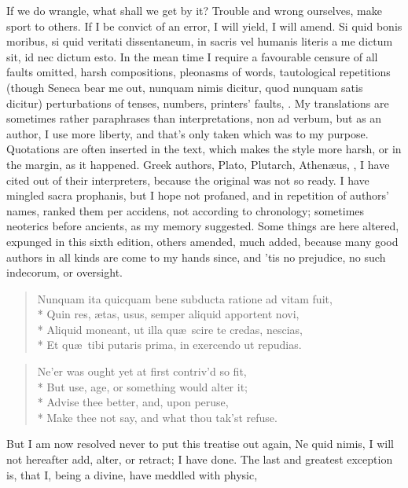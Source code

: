 {If we do wrangle, what shall we get by it? Trouble and wrong ourselves,
make sport to others. If I be convict of an error, I will yield, I will
amend. Si quid bonis moribus, si quid veritati dissentaneum, in sacris
vel humanis literis a me dictum sit, id nec dictum esto. In the mean
time I require a favourable censure of all faults omitted, harsh
compositions, pleonasms of words, tautological repetitions (though
Seneca bear me out, nunquam nimis dicitur, quod nunquam satis dicitur)
perturbations of tenses, numbers, printers' faults, \etc. My translations
are sometimes rather paraphrases than interpretations, non ad verbum,
but as an author, I use more liberty, and that's only taken which was
to my purpose. Quotations are often inserted in the text, which makes
the style more harsh, or in the margin, as it happened. Greek authors,
Plato, Plutarch, Athen\ae{}us, \etc, I have cited out of their
interpreters, because the original was not so ready. I have mingled
sacra prophanis, but I hope not profaned, and in repetition of authors'
names, ranked them per accidens, not according to chronology; sometimes
neoterics before ancients, as my memory suggested. Some things are here
altered, expunged in this sixth edition, others amended, much added,
because many good authors in all kinds are come to my hands since,
and 'tis no prejudice, no such indecorum, or oversight.

\settowidth{\versewidth}{Nunquam ita quicquam bene subducta ratione ad vitam fuit,}
\begin{verse}
\textlatin{Nunquam ita quicquam bene subducta ratione ad vitam fuit,\\*
Quin res, \ae{}tas, usus, semper aliquid apportent novi,\\*
Aliquid moneant, ut illa qu\ae{}\ scire te credas, nescias,\\*
Et qu\ae{}\ tibi putaris prima, in exercendo ut repudias.}
\end{verse}

\begin{verse}
Ne'er was ought yet at first contriv'd so fit,\\*
But use, age, or something would alter it;\\*
Advise thee better, and, upon peruse,\\*
Make thee not say, and what thou tak'st refuse.
\end{verse}

But I am now resolved never to put this treatise out again, Ne quid
nimis, I will not hereafter add, alter, or retract; I have done. The
last and greatest exception is, that I, being a divine, have meddled
with physic,

}
